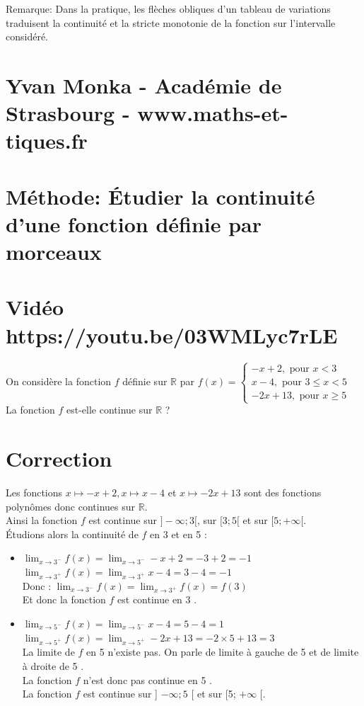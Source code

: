 \documentclass[10pt]{article}
\begin{document}
Remarque: Dans la pratique, les flèches obliques d'un tableau de variations traduisent la continuité et la stricte monotonie de la fonction sur l'intervalle considéré.

\section*{Yvan Monka - Académie de Strasbourg - www.maths-et-tiques.fr}
\section*{Méthode: Étudier la continuité d'une fonction définie par morceaux}
\section*{Vidéo https://youtu.be/03WMLyc7rLE}
On considère la fonction \(f\) définie sur \(\mathbb{R}\) par \(f(x)=\left\{\begin{array}{l}-x+2, \text { pour } x<3 \\ x-4, \text { pour } 3 \leq x<5 \\ -2 x+13, \text { pour } x \geq 5\end{array}\right.\)\\
La fonction \(f\) est-elle continue sur \(\mathbb{R}\) ?

\section*{Correction}
Les fonctions \(x \mapsto-x+2, x \mapsto x-4\) et \(x \mapsto-2 x+13\) sont des fonctions polynômes donc continues sur \(\mathbb{R}\).\\
Ainsi la fonction \(f\) est continue sur \(]-\infty ; 3[\), sur \([3 ; 5[\) et sur \([5 ;+\infty[\).\\
Étudions alors la continuité de \(f\) en 3 et en 5 :

\begin{itemize}
  \item \(\lim _{x \rightarrow 3^{-}} f(x)=\lim _{x \rightarrow 3^{-}}-x+2=-3+2=-1\)\\
\(\lim _{x \rightarrow 3^{+}} f(x)=\lim _{x \rightarrow 3^{+}} x-4=3-4=-1\)\\
Donc : \(\lim _{x \rightarrow 3^{-}} f(x)=\lim _{x \rightarrow 3^{+}} f(x)=f(3)\)\\
Et donc la fonction \(f\) est continue en 3 .
  \item \(\lim _{x \rightarrow 5^{-}} f(x)=\lim _{x \rightarrow 5^{-}} x-4=5-4=1\)\\
\(\lim _{x \rightarrow 5^{+}} f(x)=\lim _{x \rightarrow 5^{+}}-2 x+13=-2 \times 5+13=3\)\\
La limite de \(f\) en 5 n'existe pas. On parle de limite à gauche de 5 et de limite à droite de 5 .\\
La fonction \(f\) n'est donc pas continue en 5 .\\
La fonction \(f\) est continue sur ] \(-\infty ; 5\) [ et sur [5; \(+\infty\) [.
\end{itemize}
\end{document}

